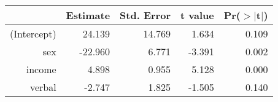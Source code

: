\begin{table}[ht]
\centering
\begin{tabular}{rrrrr}
  \hline
 & Estimate & Std. Error & t value & Pr($>$$|$t$|$) \\ 
  \hline
(Intercept) & 24.139 & 14.769 & 1.634 & 0.109 \\ 
  sex & -22.960 & 6.771 & -3.391 & 0.002 \\ 
  income & 4.898 & 0.955 & 5.128 & 0.000 \\ 
  verbal & -2.747 & 1.825 & -1.505 & 0.140 \\ 
   \hline
\end{tabular}
\end{table}
